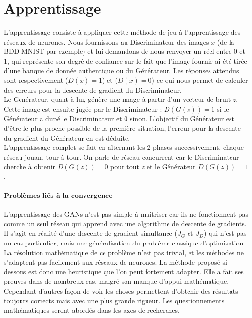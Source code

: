 \section{Apprentissage}

	\paragraph{}
		L’apprentissage consiste à appliquer cette méthode de jeu à l'apprentissage des réseaux de neurones.
		Nous fournissons au Discriminateur des images $x$ (de la BDD MNIST par exemple) et lui demandons de nous renvoyer un réel entre 0 et 1, qui représente son degré de confiance sur le fait que l’image fournie ai été tirée d’une banque de donnée authentique ou du Générateur. Les réponses attendus sont respectivement ($D(x) = 1$) et ($D(x) =0$) ce qui nous permet de calculer des erreurs pour la descente de gradient du Discriminateur.\\ 
		Le Générateur, quant à lui, génère une image à partir d’un vecteur de bruit $z$. Cette image est ensuite jugée par le Discriminateur : $D(G(z)) = 1$ si le Générateur a dupé le Discriminateur et 0 sinon. L'objectif du Générateur est d'être le plus proche possible de la première situation, l'erreur pour la descente du gradient du Générateur en est déduite.\\
		L'apprentissage complet se fait en alternant les 2 phases successivement, chaque réseau jouant tour à tour. On parle de réseau concurrent car le Discriminateur cherche à obtenir $D(G(z)) = 0 $ pour tout $z$ et le Générateur $D(G(z)) = 1$.

	\paragraph*{Problèmes liés à la convergence}
		L'apprentissage des GANs n'est pas simple à maitriser car ils ne fonctionnent pas comme un seul réseau qui apprend avec une algorithme de descente de gradients. Il s'agit en réalité d'une descente de gradient simultanée ($J_G \text{ et } J_D$) qui n'est pas un cas particulier, mais une généralisation du problème classique d'optimisation. La résolution mathématique de ce problème n'est pas trivial, et les méthodes ne s'adaptent pas facilement aux réseaux de neurones. La méthode proposé si dessous est donc une heuristique que l'on peut fortement adapter. Elle a fait ses preuves dans de nombreux cas, malgré son manque d’appui mathématique. Cependant d'autres façon de voir les choses permettent d'obtenir des résultats toujours corrects mais avec une plus grande rigueur. Les questionnements mathématiques seront abordés dans les axes de recherches.  

